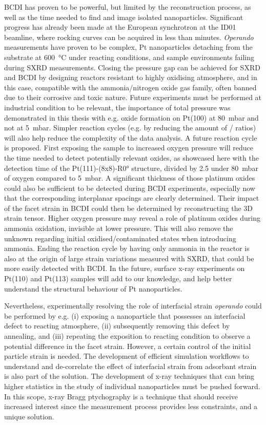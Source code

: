 BCDI has proven to be powerful, but limited by the reconstruction process, as well as the time needed to find and image isolated nanoparticles.
Significant progress has already been made at the European synchrotron at the ID01 beamline, where rocking curves can be acquired in less than minutes.
\textit{Operando} measurements have proven to be complex, Pt nanoparticles detaching from the substrate at \qty{600}{\degreeCelsius} under reacting conditions, and sample environments failing during SXRD measurements.
Closing the pressure gap can be achieved for SXRD and BCDI by designing reactors resistant to highly oxidising atmosphere, and in this case, compatible with the ammonia/nitrogen oxide gas family, often banned due to their corrosive and toxic nature.
Future experiments must be performed at industrial condition to be relevant, the importance of total pressure was demonstrated in this thesis with e.g. oxide formation on Pt(100) at \qty{80}{\milli\bar} and not at \qty{5}{\milli\bar}.
Simpler reaction cycles (e.g. by reducing the amount of / ratios) will also help reduce the complexity of the data analysis.
A future reaction cycle is proposed.
First exposing the sample to increased oxygen pressure will reduce the time needed to detect potentially relevant oxides, as showcased here with the detection time of the Pt(111)-(8x8)-R\ang{0} structure, divided by \num{2.5} under \qty{80}{\milli\bar} of oxygen compared to \qty{5}{\milli\bar}.
A significant thickness of those platinum oxides could also be sufficient to be detected during BCDI experiments, especially now that the corresponding interplanar spacings are clearly determined.
Their impact of the facet strain in BCDI could then be determined by reconstructing the 3D strain tensor.
Higher oxygen pressure may reveal a role of platinum oxides during ammonia oxidation, invisible at lower pressure.
This will also remove the unknown regarding initial oxidised/contaminated states when introducing ammonia.
Ending the reaction cycle by having only ammonia in the reactor is also at the origin of large strain variations measured with SXRD, that could be more easily detected with BCDI.
In the future, surface x-ray experiments on Pt(110) and Pt(113) samples will add to our knowledge, and help better understand the structural behaviour of Pt nanoparticles.

Nevertheless, experimentally resolving the role of interfacial strain \textit{operando} could be performed by e.g. (i) exposing a nanoparticle that possesses an interfacial defect to reacting atmosphere, (ii) subsequently removing this defect by annealing, and (iii) repeating the exposition to reacting condition to observe a potential difference in the facet strain.
However, a certain control of the initial particle strain is needed.
The development of efficient simulation workflows to understand and de-correlate the effect of interfacial strain from adsorbant strain is also part of the solution.
The development of x-ray techniques that can bring higher statistics in the study of individual nanoparticles must be pushed forward.
In this scope, x-ray Bragg ptychography is a technique that should receive increased interest since the measurement process provides less constraints, and a unique solution.

